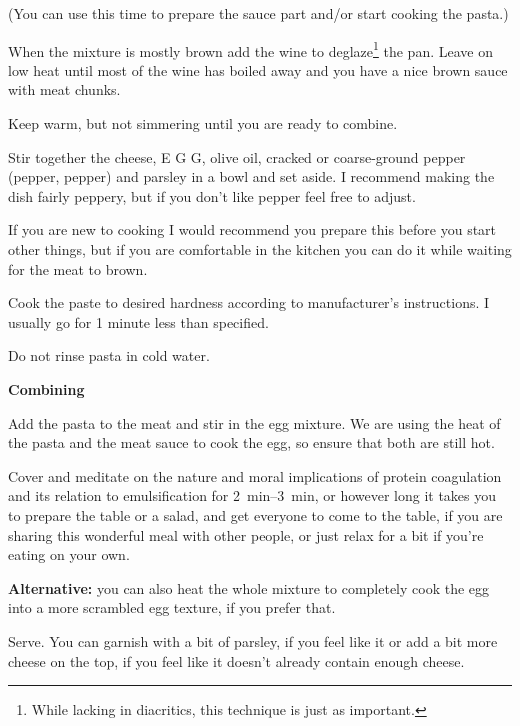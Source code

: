 \begin{recipe}
{    (You can use this time to prepare the sauce part and/or start cooking the pasta.)
    
    \step When the mixture is mostly brown add the wine to deglaze\footnote{While lacking in diacritics, this technique is just as important.} the pan. Leave on low heat until most of the wine has boiled away and you have a nice brown sauce with meat chunks.

    \step Keep warm, but not simmering until you are ready to combine.
    
    \vspace{1em}

    \step Stir together the cheese, E G G, olive oil, cracked or coarse-ground pepper (pepper, pepper) and parsley in a bowl and set aside. I recommend making the dish fairly peppery, but if you don’t like pepper feel free to adjust.
    
    If you are new to cooking I would recommend you prepare this before you start other things, but if you are comfortable in the kitchen you can do it while waiting for the meat to brown.

    \step Cook the paste to desired hardness according to manufacturer's instructions. I usually go for 1 minute less than specified.
    
    \step Do not rinse pasta in cold water.
    
    \vspace{1em}
    {\large\textbf{Combining}}
    
    \step Add the pasta to the meat and stir in the egg mixture. We are using the heat of the pasta and the meat sauce to cook the egg, so ensure that both are still hot.
    
    \step Cover and meditate on the nature and moral implications of protein coagulation and its relation to emulsification for \SIrange{2}{3}{\minute}, or however long it takes you to prepare the table or a salad, and get everyone to come to the table, if you are sharing this wonderful meal with other people, or just relax for a bit if you’re eating on your own.

    \textbf{Alternative:} you can also heat the whole mixture to completely cook the egg into a more scrambled egg texture, if you prefer that.

    \step Serve. You can garnish with a bit of parsley, if you feel like it or add a bit more cheese on the top, if you feel like it doesn’t already contain enough cheese.
    }
    
\end{recipe}